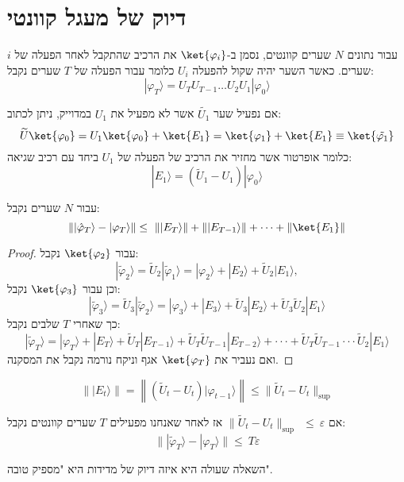 \documentclass{tstextbook}
\begin{document}
\section{דיוק של מעגל קוונטי}

\begin{symbolize}
עבור נתונים \(N\) שערים קוונטים, נסמן ב-\(\ket{\varphi_{i}}\) את הרכיב שהתקבל לאחר הפעלה של \(i\) שערים. כאשר השער יהיה שקול להפעלה \(U_{i}\)
כלומר עבור הפעלה של \(T\) שערים נקבל:
$$|\varphi_{T}\rangle=U_{T}U_{T-1}\ldots U_{2}U_{1}|\varphi_{0}\rangle$$

\end{symbolize}
\begin{proposition}
אם נפעיל שער \(\tilde{U_{1}}\) אשר לא מפעיל את \(U_{1}\) במדוייק, ניתן לכתוב: 
$$ \widetilde{U}\ket{\varphi_{0}}=U_{1}\ket{\varphi_{0}} +\ket{E_{1}} =\ket{\varphi_{1}}+\ket{E_{1}}\equiv \ket{\tilde{\varphi_{1}}} $$
כלומר אופרטור אשר מחזיר את הרכיב של הפעלה של \(U_{1}\)  ביחד עם רכיב שגיאה:
$$|E_{1}\rangle=( \widetilde{U}_{1}-U_{1})|\varphi_{0}\rangle$$

\end{proposition}
\begin{corollary}
עבור \(N\) שערים נקבל:
$$\left\lVert  |\hat{\varphi}_{T}\rangle-|\varphi_{T}\rangle  \right\rVert \leq~\left\lVert  |E_{T}\rangle  \right\rVert +\left\lVert  |E_{T-1}\rangle  \right\rVert +\dots+\lVert \ket{E_{1}} \rVert $$

\end{corollary}
\begin{proof}
עבור \(\ket{\varphi_{2}}\) נקבל:
$$|\tilde{\varphi}_{2}\rangle= \widetilde{U}_{2}|\tilde{\varphi}_{1}\rangle=|\varphi_{2}\rangle+|E_{2}\rangle+ \widetilde{U}_{2}|E_{1}\rangle,$$
וכן עבור \(\ket{\varphi_{3}}\) נקבל:
$$|\tilde{\varphi}_{3}\rangle= \widetilde{U}_{3}|\tilde{\varphi}_{2}\rangle=|\varphi_{3}\rangle+|E_{3}\rangle+ \widetilde{U}_{3}|E_{2}\rangle+ \widetilde{U}_{3} \widetilde{U}_{2}|E_{1}\rangle$$
כך שאחרי \(T\) שלבים נקבל:
$$|\tilde{\varphi}_{T}\rangle=|\varphi_{T}\rangle+|E_{T}\rangle+ \widetilde{U}_{T}|E_{T-1}\rangle+ \widetilde{U}_{T} \widetilde{U}_{T-1}|E_{T-2}\rangle+\cdot\cdot\cdot+\widetilde{U}_{T}\widetilde{U}_{T-1}\cdot\cdot\cdot\widetilde{U}_{2}|E_{1}\rangle$$
ואם נעביר את \(\ket{\varphi_{T}}\) אגף וניקח נורמה נקבל את המסקנה.

\end{proof}
\begin{proposition}
$$\left\lVert  |E_{t}\rangle  \right\rVert = \left\lVert  \left(\widetilde{U}_{t}-U_{t}\right)|\varphi_{t-1}\rangle  \right\rVert  \leq \lVert \widetilde{U}_{t}-U_{t} \rVert _{\mathrm{sup}}$$

\end{proposition}
\begin{corollary}
אם \(\parallel\widetilde{U}_{t}-U_{t}\parallel_{\mathrm{sup}}\ \ \leq\ \varepsilon\) אז לאחר שאנחנו מפעילים \(T\) שערים קוונטים נקבל:
$$\lVert |\tilde{\varphi}_{T}\rangle-|\varphi_{T}\rangle \rVert  \leq\ T\varepsilon$$

\end{corollary}
השאלה שעולה היא איזה דיוק של מדידות היא "מספיק טובה".
\end{document}
